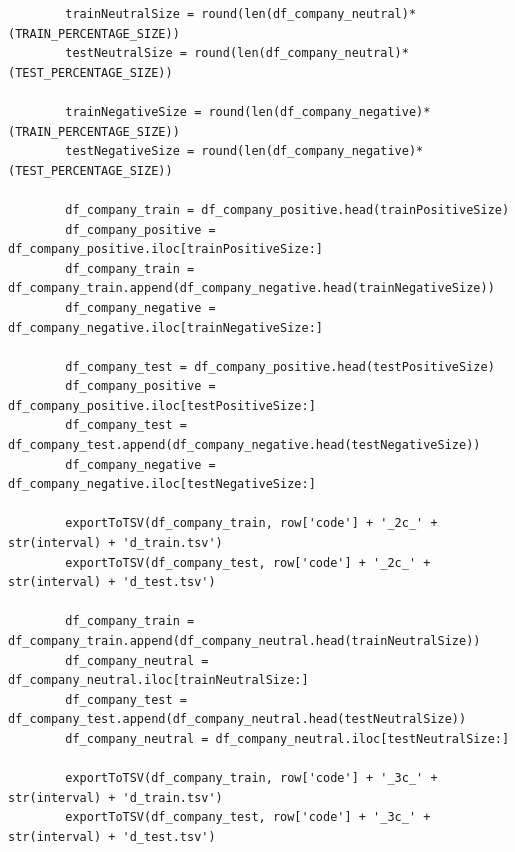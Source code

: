 \documentclass[grad,numbers]{coppe}
\begin{document}
\begin{verbatim}
        trainNeutralSize = round(len(df_company_neutral)*(TRAIN_PERCENTAGE_SIZE))
        testNeutralSize = round(len(df_company_neutral)*(TEST_PERCENTAGE_SIZE))

        trainNegativeSize = round(len(df_company_negative)*(TRAIN_PERCENTAGE_SIZE))
        testNegativeSize = round(len(df_company_negative)*(TEST_PERCENTAGE_SIZE))
        
        df_company_train = df_company_positive.head(trainPositiveSize)
        df_company_positive = df_company_positive.iloc[trainPositiveSize:]
        df_company_train = df_company_train.append(df_company_negative.head(trainNegativeSize))
        df_company_negative = df_company_negative.iloc[trainNegativeSize:]

        df_company_test = df_company_positive.head(testPositiveSize)
        df_company_positive = df_company_positive.iloc[testPositiveSize:]
        df_company_test = df_company_test.append(df_company_negative.head(testNegativeSize))
        df_company_negative = df_company_negative.iloc[testNegativeSize:]

        exportToTSV(df_company_train, row['code'] + '_2c_' + str(interval) + 'd_train.tsv')
        exportToTSV(df_company_test, row['code'] + '_2c_' + str(interval) + 'd_test.tsv')

        df_company_train = df_company_train.append(df_company_neutral.head(trainNeutralSize))
        df_company_neutral = df_company_neutral.iloc[trainNeutralSize:]
        df_company_test = df_company_test.append(df_company_neutral.head(testNeutralSize))
        df_company_neutral = df_company_neutral.iloc[testNeutralSize:]
        
        exportToTSV(df_company_train, row['code'] + '_3c_' + str(interval) + 'd_train.tsv')
        exportToTSV(df_company_test, row['code'] + '_3c_' + str(interval) + 'd_test.tsv')
			\end{verbatim}
\end{document}
